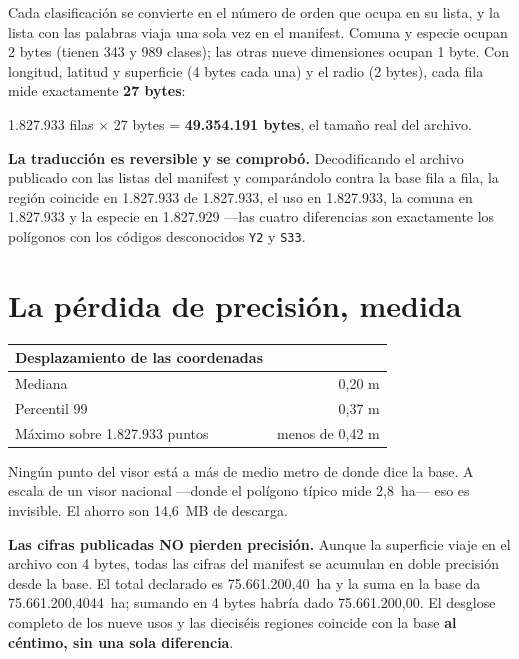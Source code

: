 \documentclass[11pt,a4paper]{report}
\newcommand{\campo}[1]{\textcolor{conaf}{\textbf{#1}}}
\newcommand{\orig}[1]{\texttt{\small #1}}
\begin{document}
Cada clasificación se convierte en el número de orden que ocupa en su lista, y
la lista con las palabras viaja una sola vez en el manifest. Comuna y especie
ocupan 2 bytes (tienen 343 y 989 clases); las otras nueve dimensiones ocupan 1
byte. Con longitud, latitud y superficie (4 bytes cada una) y el radio (2
bytes), cada fila mide exactamente \textbf{27 bytes}:

\begin{center}
1.827.933 filas × 27 bytes = \textbf{49.354.191 bytes}, el tamaño real del archivo.
\end{center}

\begin{nota}
\campo{La traducción es reversible y se comprobó.} Decodificando el archivo
publicado con las listas del manifest y comparándolo contra la base fila a fila,
la región coincide en 1.827.933 de 1.827.933, el uso en 1.827.933, la comuna en
1.827.933 y la especie en 1.827.929 —las cuatro diferencias son exactamente los
polígonos con los códigos desconocidos \orig{Y2} y \orig{S33}.
\end{nota}

\section{La pérdida de precisión, medida}

\begin{center}
\begin{tabular}{@{}L{6.4cm} r@{}}
\toprule
\textbf{Desplazamiento de las coordenadas} & \\
\midrule
Mediana & 0,20 m\\
Percentil 99 & 0,37 m\\
Máximo sobre 1.827.933 puntos & menos de 0,42 m\\
\bottomrule
\end{tabular}
\end{center}

Ningún punto del visor está a más de medio metro de donde dice la base. A escala
de un visor nacional —donde el polígono típico mide 2,8~ha— eso es invisible. El
ahorro son 14,6~MB de descarga.

\begin{nota}
\campo{Las cifras publicadas NO pierden precisión.} Aunque la superficie viaje
en el archivo con 4 bytes, todas las cifras del manifest se acumulan en doble
precisión desde la base. El total declarado es 75.661.200,40~ha y la suma en la
base da 75.661.200,4044~ha; sumando en 4 bytes habría dado 75.661.200,00. El
desglose completo de los nueve usos y las dieciséis regiones coincide con la
base \campo{al céntimo, sin una sola diferencia}.
\end{nota}
\end{document}
